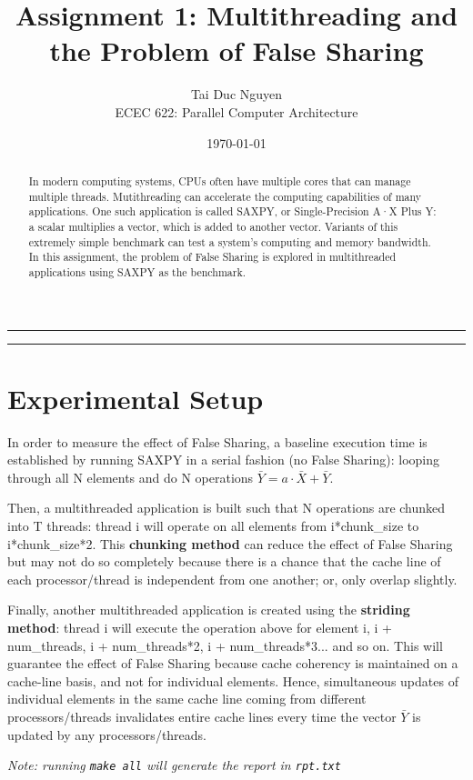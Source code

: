\documentclass[letterpaper, 11pt]{article}
\title{Assignment 1: Multithreading and the Problem of False Sharing}
\author{
Tai Duc Nguyen \\
ECEC 622: Parallel Computer Architecture
}
\date{\today}
\begin{document}
\maketitle

\rule{\textwidth}{1pt}

\begin{abstract}
	In modern computing systems, CPUs often have multiple cores that can manage multiple threads. Mutithreading can accelerate the computing capabilities of many applications. One such application is called SAXPY, or Single-Precision A·X Plus Y: a scalar multiplies a vector, which is added to another vector. Variants of this extremely simple benchmark can test a system's computing and memory bandwidth. In this assignment, the problem of False Sharing is explored in multithreaded applications using SAXPY as the benchmark. 
\end{abstract}

\rule{\textwidth}{1pt}

\section{Experimental Setup}

In order to measure the effect of False Sharing, a baseline execution time is established by running SAXPY in a serial fashion (no False Sharing): looping through all N elements and do N operations $\bar{Y} = a \cdot \bar{X} + \bar{Y}$. 

Then, a multithreaded application is built such that N operations are chunked into T threads: thread i will operate on all elements from i*chunk\_size to i*chunk\_size*2. This \textbf{chunking method} can reduce the effect of False Sharing but may not do so completely because there is a chance that the cache line of each processor/thread is independent from one another; or, only overlap slightly.

Finally, another multithreaded application is created using the \textbf{striding method}: thread i will execute the operation above for element i, i + num\_threads, i + num\_threads*2, i + num\_threads*3... and so on. This will guarantee the effect of False Sharing because cache coherency is maintained on a cache-line basis, and not for individual elements. Hence, simultaneous updates of individual elements in the same cache line coming from different processors/threads invalidates entire cache lines every time the vector $\bar{Y}$ is updated by any processors/threads.

\textit{Note: running \texttt{make all} will generate the report in \texttt{rpt.txt}}
\end{document}
